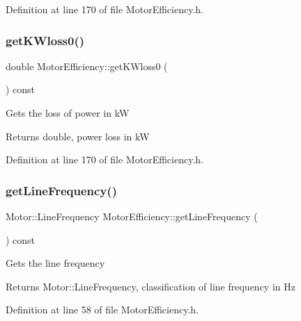 Definition at line 170 of file Motor\+Efficiency.\+h.

\mbox{\label{class_motor_efficiency_a47398ac8203f5b79a0ca435673a4bc16}} 
\subsubsection{\texorpdfstring{get\+K\+Wloss0()}{getKWloss0()}\hspace{0.1cm}{\footnotesize\ttfamily [3/3]}}
{\footnotesize\ttfamily double Motor\+Efficiency\+::get\+K\+Wloss0 (\begin{DoxyParamCaption}{ }\end{DoxyParamCaption}) const\hspace{0.3cm}{\ttfamily [inline]}}

Gets the loss of power in kW \begin{DoxyReturn}{Returns}
double, power loss in kW 
\end{DoxyReturn}


Definition at line 170 of file Motor\+Efficiency.\+h.

\mbox{\label{class_motor_efficiency_a3cc0ed606154a04d035399e05d1cb02a}} 
\subsubsection{\texorpdfstring{get\+Line\+Frequency()}{getLineFrequency()}\hspace{0.1cm}{\footnotesize\ttfamily [1/3]}}
{\footnotesize\ttfamily Motor\+::\+Line\+Frequency Motor\+Efficiency\+::get\+Line\+Frequency (\begin{DoxyParamCaption}{ }\end{DoxyParamCaption}) const\hspace{0.3cm}{\ttfamily [inline]}}

Gets the line frequency \begin{DoxyReturn}{Returns}
Motor\+::\+Line\+Frequency, classification of line frequency in Hz 
\end{DoxyReturn}


Definition at line 58 of file Motor\+Efficiency.\+h.

